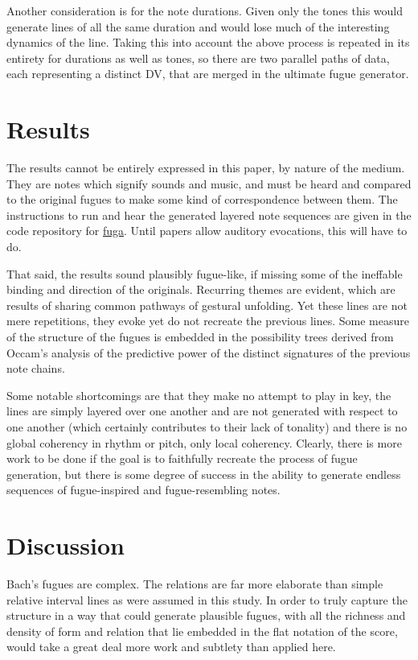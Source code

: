 \documentclass[11pt]{article}
\begin{document}
Another consideration is for the note durations.  Given only the tones this would generate lines of all the same duration and would lose much of the interesting dynamics of the line.  Taking this into account the above process is repeated in its entirety for durations as well as tones, so there are two parallel paths of data, each representing a distinct DV, that are merged in the ultimate fugue generator.  

\section{Results}

The results cannot be entirely expressed in this paper, by nature of the medium.  They are notes which signify sounds and music, and must be heard and compared to the original fugues to make some kind of correspondence between them.  The instructions to run and hear the generated layered note sequences are given in the code repository for \href{http://github.com/prismofeverything/fuga}{fuga}.  Until papers allow auditory evocations, this will have to do.  

That said, the results sound plausibly fugue-like, if missing some of the ineffable binding and direction of the originals.  Recurring themes are evident, which are results of sharing common pathways of gestural unfolding.  Yet these lines are not mere repetitions, they evoke yet do not recreate the previous lines.  Some measure of the structure of the fugues is embedded in the possibility trees derived from Occam's analysis of the predictive power of the distinct signatures of the previous note chains.  

Some notable shortcomings are that they make no attempt to play in key, the lines are simply layered over one another and are not generated with respect to one another (which certainly contributes to their lack of tonality) and there is no global coherency in rhythm or pitch, only local coherency.  Clearly, there is more work to be done if the goal is to faithfully recreate the process of fugue generation, but there is some degree of success in the ability to generate endless sequences of fugue-inspired and fugue-resembling notes.

\section{Discussion}

Bach's fugues are complex.  The relations are far more elaborate than simple relative interval lines as were assumed in this study.  In order to truly capture the structure in a way that could generate plausible fugues, with all the richness and density of form and relation that lie embedded in the flat notation of the score, would take a great deal more work and subtlety than applied here.  
\end{document}
